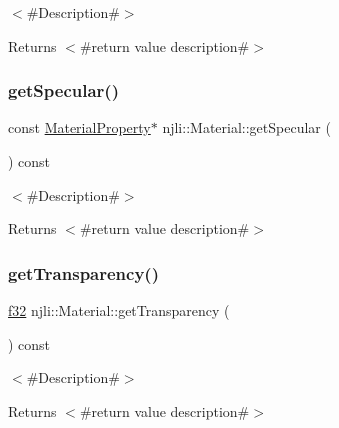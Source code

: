 $<$\#\+Description\#$>$

\begin{DoxyReturn}{Returns}
$<$\#return value description\#$>$ 
\end{DoxyReturn}
\mbox{\label{classnjli_1_1_material_af00611506e87ee56810e5a6673e8eff5}} 
\subsubsection{\texorpdfstring{get\+Specular()}{getSpecular()}\hspace{0.1cm}{\footnotesize\ttfamily [2/2]}}
{\footnotesize\ttfamily const \mbox{\hyperlink{classnjli_1_1_material_property}{Material\+Property}}$\ast$ njli\+::\+Material\+::get\+Specular (\begin{DoxyParamCaption}{ }\end{DoxyParamCaption}) const}

$<$\#\+Description\#$>$

\begin{DoxyReturn}{Returns}
$<$\#return value description\#$>$ 
\end{DoxyReturn}
\mbox{\label{classnjli_1_1_material_aea9acf595dbc594ec215c9c42842e79c}} 
\subsubsection{\texorpdfstring{get\+Transparency()}{getTransparency()}}
{\footnotesize\ttfamily \mbox{\hyperlink{_util_8h_a5f6906312a689f27d70e9d086649d3fd}{f32}} njli\+::\+Material\+::get\+Transparency (\begin{DoxyParamCaption}{ }\end{DoxyParamCaption}) const}

$<$\#\+Description\#$>$

\begin{DoxyReturn}{Returns}
$<$\#return value description\#$>$ 
\end{DoxyReturn}
\mbox{\label{classnjli_1_1_material_a0b8c45cc2da094f6c0cb89fe3e597ec8}} 
